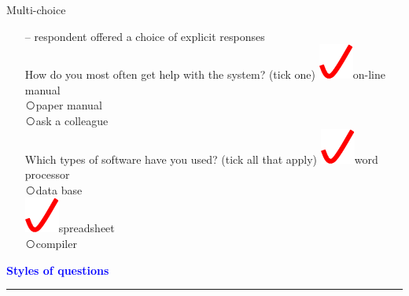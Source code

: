 \documentclass[pdf]{beamer}
\begin{document}
{{{{{{{{\begin{frame}
    Multi-choice
    \begin{itemize}
      \item[\textcolor{black}{--}] respondent offered a choice of explicit responses\\
      \vspace{5mm}
      How do you most often get help with the system? (tick one)
{\large\hspace{5mm}\textcircled{\includegraphics[scale = 0.6]{28_30_Imagine.png}}\hspace{4mm}on-line manual}\\ {\large\textcircled{}\hspace{4mm}paper manual}\\      {\large\textcircled{}\hspace{4mm}ask a colleague}\\
  \vspace{5mm}
      Which types of software have you used? (tick all that apply)
{\large\hspace{5mm}\textcircled{\includegraphics[scale = 0.6]{28_30_Imagine.png}}\hspace{4mm}word processor}\\ {\large\textcircled{}\hspace{4mm}data base}\\      {\large\textcircled{\includegraphics[scale = 0.6]{28_30_Imagine.png}}\hspace{4mm}spreadsheet}\\
 {\large\textcircled{}\hspace{4mm}compiler}
    \end{itemize}   
\end{frame}




{
\begin{frame}
	\vspace{8mm}
	\textcolor{Blue}{\textbf{\large{Styles of questions}}}
    \textcolor{red}{\rule{10cm}{1mm}}
    

\end{frame}}}}}}}}}}
\end{document}
